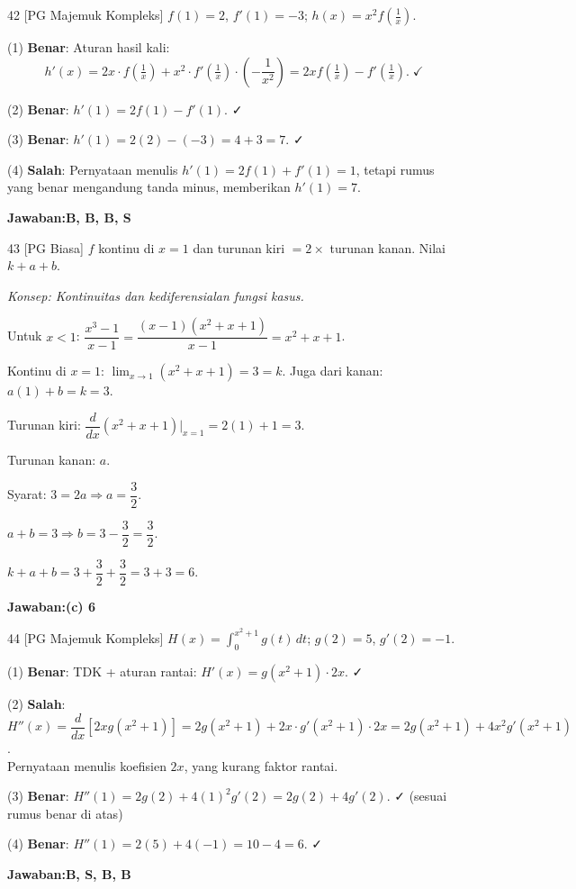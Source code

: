 \documentclass[11pt]{article}
\newcommand{\jawaban}[1]{\textbf{Jawaban:}\enspace\colorbox{gold!30}{\textbf{#1}}}
\newcommand{\konsep}[1]{\textit{Konsep: #1.}}
\begin{document}
\begin{soal}{42 \normalfont\small[PG Majemuk Kompleks]}
$f(1)=2$, $f'(1)=-3$; $h(x)=x^2f\!\left(\tfrac{1}{x}\right)$.
\end{soal}
\begin{pembox}
(1) \textbf{Benar}: Aturan hasil kali:
\[
h'(x)=2x\cdot f\!\left(\tfrac1x\right)+x^2\cdot f'\!\left(\tfrac1x\right)\cdot\left(-\frac{1}{x^2}\right)
=2xf\!\left(\tfrac1x\right)-f'\!\left(\tfrac1x\right).\;\checkmark
\]

(2) \textbf{Benar}: $h'(1)=2f(1)-f'(1)$. ✓

(3) \textbf{Benar}: $h'(1)=2(2)-(-3)=4+3=7$. ✓

(4) \textbf{Salah}: Pernyataan menulis $h'(1)=2f(1)+f'(1)=1$, tetapi rumus yang benar mengandung tanda minus, memberikan $h'(1)=7$.

\jawaban{B, B, B, S}
\end{pembox}

\begin{soal}{43 \normalfont\small[PG Biasa]}
$f$ kontinu di $x=1$ dan turunan kiri $=2\times$ turunan kanan. Nilai $k+a+b$.
\end{soal}
\begin{pembox}
\konsep{Kontinuitas dan kediferensialan fungsi kasus}

Untuk $x<1$: $\dfrac{x^3-1}{x-1}=\dfrac{(x-1)(x^2+x+1)}{x-1}=x^2+x+1$.

Kontinu di $x=1$: $\lim_{x\to1}(x^2+x+1)=3=k$. Juga dari kanan: $a(1)+b=k=3$.

Turunan kiri: $\dfrac{d}{dx}(x^2+x+1)\big|_{x=1}=2(1)+1=3$.

Turunan kanan: $a$.

Syarat: $3=2a\Rightarrow a=\dfrac{3}{2}$.

$a+b=3\Rightarrow b=3-\dfrac{3}{2}=\dfrac{3}{2}$.

$k+a+b=3+\dfrac{3}{2}+\dfrac{3}{2}=3+3=6$.

\jawaban{(c) 6}
\end{pembox}

\begin{soal}{44 \normalfont\small[PG Majemuk Kompleks]}
$H(x)=\displaystyle\int_0^{x^2+1}g(t)\,dt$; $g(2)=5$, $g'(2)=-1$.
\end{soal}
\begin{pembox}
(1) \textbf{Benar}: TDK + aturan rantai: $H'(x)=g(x^2+1)\cdot2x$. ✓

(2) \textbf{Salah}: $H''(x)=\dfrac{d}{dx}[2xg(x^2+1)]=2g(x^2+1)+2x\cdot g'(x^2+1)\cdot2x=2g(x^2+1)+4x^2g'(x^2+1)$.\\
Pernyataan menulis koefisien $2x$, yang kurang faktor rantai.

(3) \textbf{Benar}: $H''(1)=2g(2)+4(1)^2g'(2)=2g(2)+4g'(2)$. ✓ (sesuai rumus benar di atas)

(4) \textbf{Benar}: $H''(1)=2(5)+4(-1)=10-4=6$. ✓

\jawaban{B, S, B, B}
\end{pembox}
\end{document}

